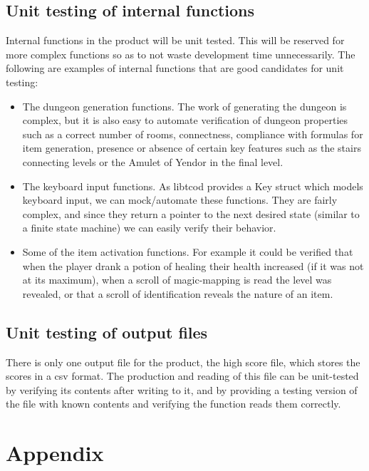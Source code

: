 \documentclass[12pt, titlepage]{article}
\begin{document}
	\subsection{Unit testing of internal functions}
		Internal functions in the product will be unit tested. This will be reserved for more complex functions so as to not waste development time unnecessarily. The following are examples of internal functions that are good candidates for unit testing:
		\begin{itemize}
			\item The dungeon generation functions. The work of generating the dungeon is complex, but it is also easy to automate verification of dungeon properties such as a correct number of rooms, connectness, compliance with formulas for item generation, presence or absence of certain key features such as the stairs connecting levels or the Amulet of Yendor in the final level.
			\item The keyboard input functions. As libtcod provides a Key struct which models keyboard input, we can mock/automate these functions. They are fairly complex, and since they return a pointer to the next desired state (similar to a finite state machine) we can easily verify their behavior.
			\item Some of the item activation functions. For example it could be verified that when the player drank a potion of healing their health increased (if it was not at its maximum), when a scroll of magic-mapping is read the level was revealed, or that a scroll of identification reveals the nature of an item.
		\end{itemize}

	\subsection{Unit testing of output files}
		There is only one output file for the product, the high score file, which stores the scores in a csv format. The production and reading of this file can be unit-tested by verifying its contents after writing to it, and by providing a testing version of the file with known contents and verifying the function reads them correctly.

% 

% 

\newpage

\section{Appendix}
\end{document}
